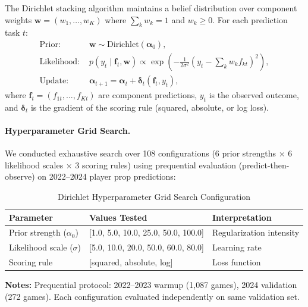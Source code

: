 The Dirichlet stacking algorithm maintains a belief distribution over component weights $\mathbf{w} = (w_1, \ldots, w_K)$ where $\sum_k w_k = 1$ and $w_k \geq 0$. For each prediction task $t$:
\begin{align}
\text{Prior: } & \mathbf{w} \sim \text{Dirichlet}(\boldsymbol{\alpha}_0), \label{eq:dirichlet-prior-evo}\\
\text{Likelihood: } & p(y_t \mid \mathbf{f}_t, \mathbf{w}) \propto \exp\left(-\frac{1}{2\sigma^2} \left(y_t - \sum_k w_k f_{kt}\right)^2\right), \label{eq:dirichlet-likelihood-evo}\\
\text{Update: } & \boldsymbol{\alpha}_{t+1} = \boldsymbol{\alpha}_t + \boldsymbol{\delta}_t(\mathbf{f}_t, y_t), \label{eq:dirichlet-update-evo}
\end{align}
where $\mathbf{f}_t = (f_{1t}, \ldots, f_{Kt})$ are component predictions, $y_t$ is the observed outcome, and $\boldsymbol{\delta}_t$ is the gradient of the scoring rule (squared, absolute, or log loss).

\paragraph{Hyperparameter Grid Search.}
We conducted exhaustive search over 108 configurations (6 prior strengths × 6 likelihood scales × 3 scoring rules) using prequential evaluation (predict-then-observe) on 2022--2024 player prop predictions:

\begin{table}[htbp]
\centering
\caption{Dirichlet Hyperparameter Grid Search Configuration}
\label{tab:dirichlet-grid-config}
\small
\begin{tabular}{@{} l l l @{}}
\toprule
\textbf{Parameter} & \textbf{Values Tested} & \textbf{Interpretation} \\
\midrule
Prior strength ($\alpha_0$) & [1.0, 5.0, 10.0, 25.0, 50.0, 100.0] & Regularization intensity \\
Likelihood scale ($\sigma$) & [5.0, 10.0, 20.0, 50.0, 60.0, 80.0] & Learning rate \\
Scoring rule & [squared, absolute, log] & Loss function \\
\bottomrule
\end{tabular}
\begin{tablenotes}
\item \textbf{Notes:} Prequential protocol: 2022--2023 warmup (1,087 games), 2024 validation (272 games). Each configuration evaluated independently on same validation set.
\end{tablenotes}
\end{table}

